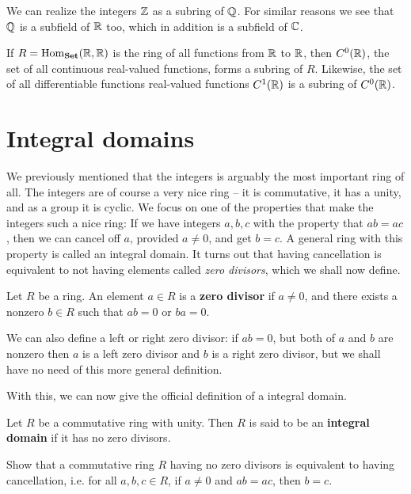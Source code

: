 \documentclass[./main.tex]{subfiles}
\begin{document}
\begin{example}
    We can realize the integers $\mathbb{Z}$ as a subring of $\mathbb{Q}$. For similar reasons
    we see that $\mathbb{Q}$ is a subfield of $\mathbb{R}$ too, which in addition is a
    subfield of $\mathbb{C}$. 
\end{example}

\begin{example}
    If $R = \operatorname{Hom}_{\mathbf{Set}}(\mathbb{R}, \mathbb{R})$ is the ring of all
    functions from $\mathbb{R}$ to $\mathbb{R}$, then $C^0(\mathbb{R})$, the set of all continuous
    real-valued functions, forms a subring of $R$. Likewise, the set of all
    differentiable functions real-valued functions $C^1(\mathbb{R})$ is a subring of
    $C^0(\mathbb{R})$.
\end{example}


\section{Integral domains}
We previously mentioned that the integers is arguably the most important ring of
all. The integers are of course a very nice ring -- it is commutative, it has a
unity, and as a group it is cyclic. We focus on one of the properties that make
the integers such a nice ring: If we have integers $a,b,c$ with the property
that $ab = ac$, then we can cancel off $a$, provided $a \neq 0$, and get $b=c$.
A general ring with this property is called an integral domain. It turns out
that having cancellation is equivalent to not having elements called \emph{zero
divisors}, which we shall now define.

\begin{definition}
\label{def:zero-divisor}
Let $R$ be a ring. An element $a \in R$ is a \textbf{zero divisor} if $a \neq
0$, and there exists a nonzero $b \in R$ such that $ab = 0$ or $ba = 0$.
\end{definition}
We can also define a left or right zero divisor: if $ab = 0$, but both of $a$
and $b$ are nonzero then $a$ is a left zero divisor and $b$ is a right zero
divisor, but we shall have no need of this more general definition.

With this, we can now give the official definition of a integral domain.
\begin{definition}
\label{def:integral-domain}
Let $R$ be a commutative ring with unity. Then $R$ is said to be an
\textbf{integral domain} if it has no zero divisors.
\end{definition}

\begin{exercise}
    Show that a commutative ring $R$ having no zero divisors is equivalent to
    having cancellation, i.e. for all $a,b,c \in R$, if $a \neq 0$ and $ab =
    ac$, then $b = c$.
\end{exercise}
\end{document}
